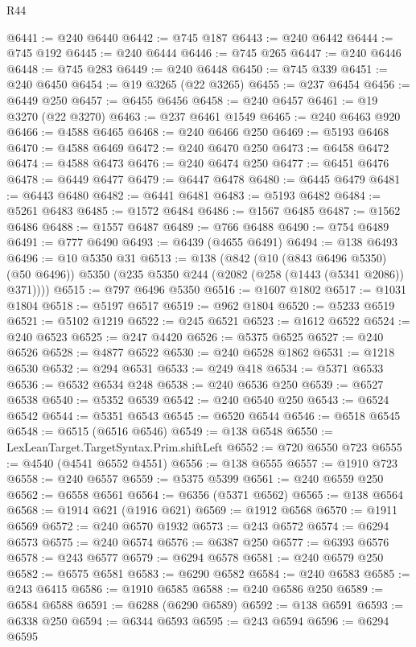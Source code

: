 \begin{lexlean}{R44}
\begin{coremodule}
{@6441 := @240 @6440
@6442 := @745 @187
@6443 := @240 @6442
@6444 := @745 @192
@6445 := @240 @6444
@6446 := @745 @265
@6447 := @240 @6446
@6448 := @745 @283
@6449 := @240 @6448
@6450 := @745 @339
@6451 := @240 @6450
@6454 := @19 @3265 (@22 @3265)
@6455 := @237 @6454
@6456 := @6449 @250
@6457 := @6455 @6456
@6458 := @240 @6457
@6461 := @19 @3270 (@22 @3270)
@6463 := @237 @6461 @1549
@6465 := @240 @6463 @920
@6466 := @4588 @6465
@6468 := @240 @6466 @250
@6469 := @5193 @6468
@6470 := @4588 @6469
@6472 := @240 @6470 @250
@6473 := @6458 @6472
@6474 := @4588 @6473
@6476 := @240 @6474 @250
@6477 := @6451 @6476
@6478 := @6449 @6477
@6479 := @6447 @6478
@6480 := @6445 @6479
@6481 := @6443 @6480
@6482 := @6441 @6481
@6483 := @5193 @6482
@6484 := @5261 @6483
@6485 := @1572 @6484
@6486 := @1567 @6485
@6487 := @1562 @6486
@6488 := @1557 @6487
@6489 := @766 @6488
@6490 := @754 @6489
@6491 := @777 @6490
@6493 := @6439 (@4655 @6491)
@6494 := @138 @6493
@6496 := @10 @5350 @31
@6513 := @138
    (@842
      (@10 (@843 @6496 @5350) (@50 @6496))
      @5350
      (@235 @5350 @244 (@2082 (@258 (@1443 (@5341 @2086)) @371))))
@6515 := @797 @6496 @5350
@6516 := @1607 @1802
@6517 := @1031 @1804
@6518 := @5197 @6517
@6519 := @962 @1804
@6520 := @5233 @6519
@6521 := @5102 @1219
@6522 := @245 @6521
@6523 := @1612 @6522
@6524 := @240 @6523
@6525 := @247 @4420
@6526 := @5375 @6525
@6527 := @240 @6526
@6528 := @4877 @6522
@6530 := @240 @6528 @1862
@6531 := @1218 @6530
@6532 := @294 @6531
@6533 := @249 @418
@6534 := @5371 @6533
@6536 := @6532 @6534 @248
@6538 := @240 @6536 @250
@6539 := @6527 @6538
@6540 := @5352 @6539
@6542 := @240 @6540 @250
@6543 := @6524 @6542
@6544 := @5351 @6543
@6545 := @6520 @6544
@6546 := @6518 @6545
@6548 := @6515 (@6516 @6546)
@6549 := @138 @6548
@6550 := LexLeanTarget.TargetSyntax.Prim.shiftLeft
@6552 := @720 @6550 @723
@6555 := @4540 (@4541 @6552 @4551)
@6556 := @138 @6555
@6557 := @1910 @723
@6558 := @240 @6557
@6559 := @5375 @5399
@6561 := @240 @6559 @250
@6562 := @6558 @6561
@6564 := @6356 (@5371 @6562)
@6565 := @138 @6564
@6568 := @1914 @621 (@1916 @621)
@6569 := @1912 @6568
@6570 := @1911 @6569
@6572 := @240 @6570 @1932
@6573 := @243 @6572
@6574 := @6294 @6573
@6575 := @240 @6574
@6576 := @6387 @250
@6577 := @6393 @6576
@6578 := @243 @6577
@6579 := @6294 @6578
@6581 := @240 @6579 @250
@6582 := @6575 @6581
@6583 := @6290 @6582
@6584 := @240 @6583
@6585 := @243 @6415
@6586 := @1910 @6585
@6588 := @240 @6586 @250
@6589 := @6584 @6588
@6591 := @6288 (@6290 @6589)
@6592 := @138 @6591
@6593 := @6338 @250
@6594 := @6344 @6593
@6595 := @243 @6594
@6596 := @6294 @6595
}
\end{coremodule}
\end{lexlean}
